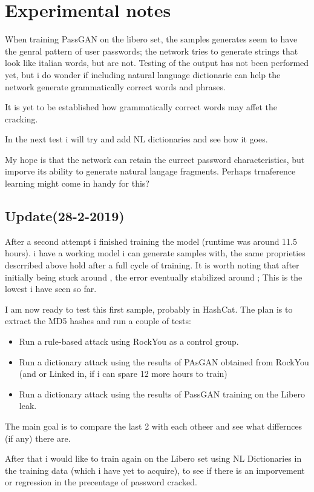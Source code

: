 \section{Experimental notes}
When training PassGAN on the libero set, the samples generates seem to have the genral pattern of user passwords; the network tries to generate strings that look like italian words, but are not. Testing of the output has not been performed yet, but i do wonder if including natural language dictionarie can help the network generate grammatically correct words and phrases.

It is yet to be established how grammatically correct words may affet the cracking.

In the next test i will try and add NL dictionaries and see how it goes. 

My hope is that the network can retain the currect password characteristics, but imporve its ability to generate natural langage fragments. Perhaps trnaference learning might come in handy for this?

\subsection{Update(28-2-2019)}

After a second attempt i finished training the model (runtime was around 11.5 hours). i have a working model i can generate samples with, the same proprieties descrribed above hold after a full cycle of training. It is worth noting that after initially being stuck around , the error eventually stabilized around ; This is the lowest i have seen so far.

I am now ready to test this first sample, probably in HashCat. The plan is to extract the MD5 hashes and run a couple of tests:

\begin{itemize}
\item Run a rule-based attack using RockYou as a control group.
\item Run a dictionary attack using the results of PAsGAN obtained from RockYou (and or Linked in, if i can spare 12 more hours to train)
\item Run a dictionary attack using the results of PassGAN training on the Libero leak.
\end{itemize}

The main goal is to compare the last 2 with each otheer and see what differnces (if any) there are.

After that i would like to train again on the Libero set using NL Dictionaries in the training data (which i have yet to acquire), to see if there is an imporvement or regression in the precentage of password cracked.

